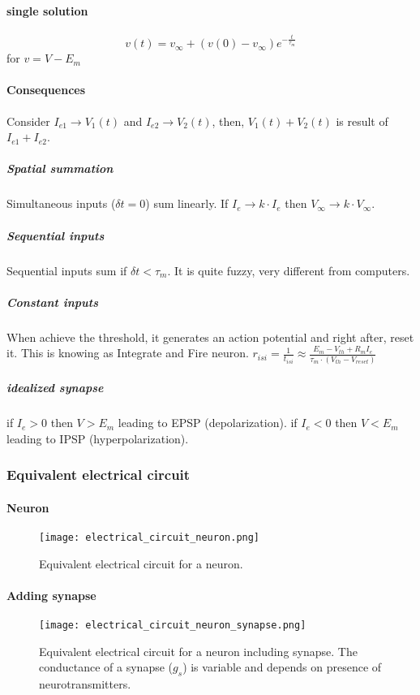 \documentclass[main]{subfiles}
\begin{document}
\paragraph{single solution}
\[v(t) = v_\infty+(v(0)-v_\infty)e^{-\frac{t}{\tau_m}}\]
for $v = V - E_m$

\paragraph{Consequences}
Consider $I_{e1} \rightarrow V_1(t)$ and $I_{e2} \rightarrow V_2(t)$, then, $V_1(t) + V_2(t)$ is result of $I_{e1} + I_{e2}$.

\subparagraph{Spatial summation} 
Simultaneous inputs ($\delta t = 0$) sum linearly.
If $I_e \rightarrow k \cdot I_e$ then $V_\infty \rightarrow k \cdot V_\infty$.

\subparagraph{Sequential inputs}
Sequential inputs sum if $\delta t < \tau_m$.
It is quite fuzzy, very different from computers.

\subparagraph{Constant inputs}
When achieve the threshold, it generates an action potential and right after, reset it. This is knowing as Integrate and Fire neuron.
$r_{isi} = \frac{1}{t_{isi}} \approx \frac{E_m - V_{th} + R_m I_e}{\tau_m \cdot (V_{th} - V_{reset})}$

\subparagraph{idealized synapse}
if $I_e > 0$ then $V > E_m$ leading to EPSP (depolarization). 
if $I_e < 0$ then $V < E_m$ leading to IPSP (hyperpolarization).

\subsubsection{Equivalent electrical circuit}

\paragraph{Neuron}

\begin{figure}[H]
	\centering
	\texttt{[image: electrical\_circuit\_neuron.png]}
	\caption{Equivalent electrical circuit for a neuron.}
\end{figure}

\paragraph{Adding synapse}

\begin{figure}[H]
	\centering
	\texttt{[image: electrical\_circuit\_neuron\_synapse.png]}
	\caption{Equivalent electrical circuit for a neuron including synapse. The conductance of a synapse ($g_s$) is variable and depends on presence of neurotransmitters.}
\end{figure}
\end{document}
